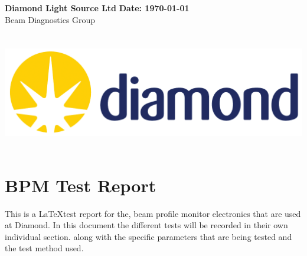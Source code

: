 \documentclass[a4paper, 11pt]{article}%
\begin{document}
%
\normalsize%
\noindent%
\large\textbf{Diamond Light Source Ltd} \hfill\large\textbf{Date: \today}%
\\\normalsize Beam Diagnostics Group \hfill\\%
\\\\\includegraphics[width = 1\textwidth]{./Latex_Report/Logo.PNG}\\\\%
\section*{BPM Test Report}%
This is a \LaTeX test report for the, beam profile monitor electronics that are used at Diamond. In this document the different tests will be recorded in their own individual section. along with the specific parameters that are being tested and the test method used.\\\\%
\clearpage%
\tableofcontents%
\listoffigures%
\clearpage%
\end{document}
